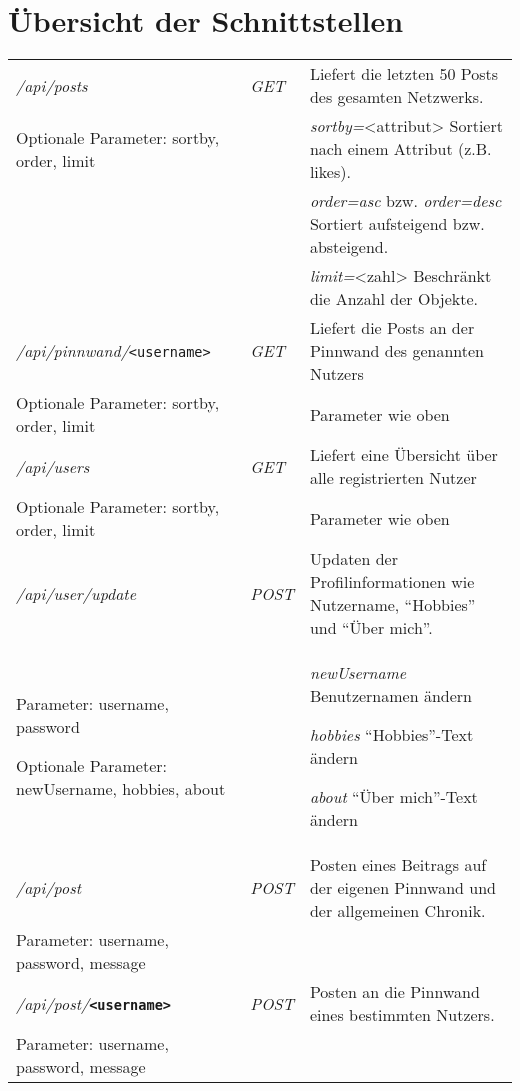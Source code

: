 \documentclass[parskip=half*]{scrartcl}
\begin{document}
\section*{Übersicht der Schnittstellen}
\bgroup
\def\arraystretch{1.5}%
\begin{table}[ht]
\begin{center}
\begin{tabular}{|L{7cm}|C{1.2cm}|L{7cm}|}\hline
\emph{/api/posts} & \emph{GET} & Liefert die letzten 50 Posts des gesamten Netzwerks.\\ 
Optionale Parameter: sortby, order, limit & & \emph{sortby=}<attribut> Sortiert nach einem Attribut (z.B. likes). \\ && \emph{order=asc} bzw. \emph{order=desc} Sortiert aufsteigend bzw. absteigend. \\&& \emph{limit=}<zahl> Beschränkt die Anzahl der Objekte.\\ \hline

\emph{/api/pinnwand/}\texttt{<username>} & \emph{GET} & Liefert die Posts an der Pinnwand des genannten Nutzers\\
Optionale Parameter: sortby, order, limit & & Parameter wie oben \\ \hline

\emph{/api/users} & \emph{GET} & Liefert eine Übersicht über alle registrierten Nutzer\\ 
Optionale Parameter: sortby, order, limit & & Parameter wie oben \\ \hline\hline

\emph{/api/user/update} & \emph{POST} & Updaten der Profilinformationen wie Nutzername, \enquote{Hobbies} und \enquote{Über mich}.\\
Parameter: username, password 

Optionale Parameter: newUsername, hobbies, about & & \emph{newUsername} Benutzernamen ändern

\emph{hobbies} \enquote{Hobbies}-Text ändern 

\emph{about} \enquote{Über mich}-Text ändern\\ \hline

\emph{/api/post} & \emph{POST} & Posten eines Beitrags auf der eigenen Pinnwand und der allgemeinen Chronik.\\
Parameter: username, password, message & & \\ \hline

\emph{/api/post/}\textbf{\texttt{<username>}} & \emph{POST} & Posten an die Pinnwand eines bestimmten Nutzers. \\
Parameter: username, password, message & &\\\hline


\end{tabular}
\end{center}
\end{table}
\end{document}
